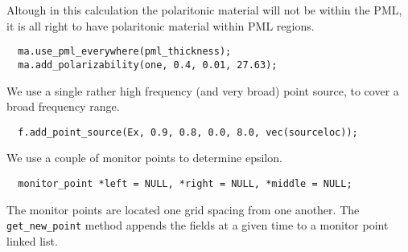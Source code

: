 \begin{comment}
const double a = 10;
const double pml_thickness = 1.0;
const double middlesize = 1.0;
const double zsize = middlesize + 2*pml_thickness;
\end{verbatim}

For our example polaritonic material, we'll use an $\epsilon(0)$ of 13.4. %

\begin{verbatim}
double eps(const vec &) { return 13.4; }
\end{verbatim}
\begin{comment}
double one(const vec &p) {
  return 1;
}

int main(int argc, char **argv) {
  initialize mpi(argc, argv);
  deal_with_ctrl_c();
  const double ttot =2000.0;
  const volume v = volone(zsize, a);
  const symmetry S = mirror(Z, v);
  mat ma(v, eps, 0, S);
  const char *dirname = make_output_directory(argv[0]);
  ma.set_output_directory(dirname);
\end{comment}
Altough in this calculation the polaritonic material will not be within the
PML, it is all right to have polaritonic material within PML regions.
\begin{verbatim}
  ma.use_pml_everywhere(pml_thickness);
  ma.add_polarizability(one, 0.4, 0.01, 27.63);
\end{verbatim}
\begin{comment}
  fields f(&ma);
  double sourceloc = pml_thickness+1.0/(double)a;
\end{comment}
We use a single rather high frequency (and very broad) point source, to
cover a broad frequency range.
\begin{verbatim}
  f.add_point_source(Ex, 0.9, 0.8, 0.0, 8.0, vec(sourceloc));
\end{verbatim}
We use a couple of monitor points to determine epsilon.
\begin{verbatim}
  monitor_point *left = NULL, *right = NULL, *middle = NULL;
\end{verbatim}
\begin{comment}
  double next_printtime = 100;
  while (f.time() <= ttot && !interrupt) {
    if (f.time() >= next_printtime) {
      next_printtime += 100;
      master_printf("Working on time %
      master_printf("energy is %
    }
\end{comment}
The monitor points are located one grid spacing from one another.  The
\verb*|get_new_point| method appends the fields at a given time to a
monitor point linked list.
